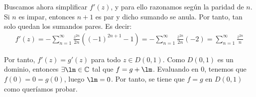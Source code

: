 \begin{ejercicio}
\begin{enumerate}
        Buscamos ahora simplificar $f'(z)$, y para ello razonamos según la paridad de $n$. Si $n$ es impar, entonces $n+1$ es par y dicho sumando se anula. Por tanto, tan solo quedan los sumandos pares. Es decir:
        \begin{align*}
            f'(z) = -\sum_{n=1}^\infty \frac{z^{2n}}{2n}\left((-1)^{2n+1}-1\right) = -\sum_{n=1}^\infty \frac{z^{2n}}{2n}\left(-2\right) = \sum_{n=1}^\infty \frac{z^{2n}}{n}
        \end{align*}

        Por tanto, $f'(z)=g'(z)$ para todo $z\in D(0,1)$. Como $D(0,1)$ es un dominio, entonces $\exists \lm\in \bb{C}$ tal que $f=g+\lm$. Evaluando en $0$, tenemos que $f(0)=0=g(0)$, luego $\lm=0$. Por tanto, se tiene que $f=g$ en $D(0,1)$ como queríamos probar.
    \end{enumerate}
\end{ejercicio}

